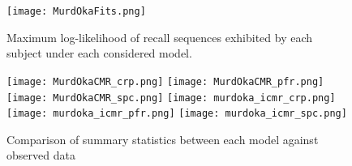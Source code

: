 \begin{figure}[h] \centering \texttt{[image: MurdOkaFits.png]} \caption{Maximum log-likelihood of recall sequences exhibited by each subject under each considered model. \cite{murdock1970interresponse}} \label{fig:MurdOkaFits} \end{figure}\markdownRendererInterblockSeparator
{}\begin{figure}[h] \centering \texttt{[image: MurdOkaCMR\_crp.png]} \texttt{[image: MurdOkaCMR\_pfr.png]} \texttt{[image: MurdOkaCMR\_spc.png]} \texttt{[image: murdoka\_icmr\_crp.png]} \texttt{[image: murdoka\_icmr\_pfr.png]} \texttt{[image: murdoka\_icmr\_spc.png]} \caption{Comparison of summary statistics between each model against observed data \citep{murdock1970interresponse}} \label{fig:MurdOkaSummary} \end{figure}\relax